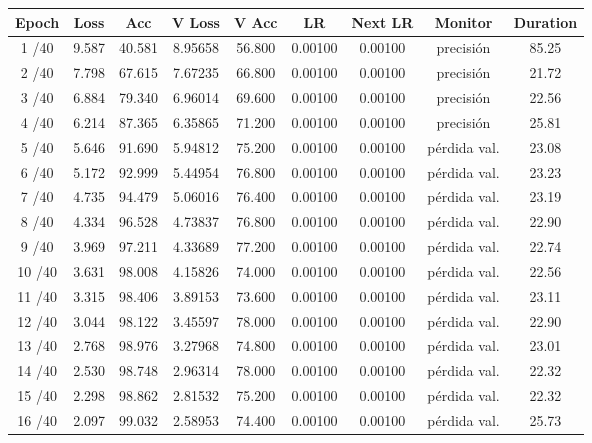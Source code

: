     \begin{table}[H]
        \small
        \centering
        \begin{tabular}{|c|c|c|c|c|c|c|c|c|}
        \hline
        \textbf{Epoch} & \textbf{Loss} & \textbf{Acc} & \textbf{V Loss} & \textbf{V Acc} & \textbf{LR} & \textbf{Next LR} & \textbf{Monitor} & \textbf{Duration} \\ \hline
        1 /40  & 9.587  & 40.581 & 8.95658 & 56.800 & 0.00100 & 0.00100 & precisión & 85.25  \\ \hline
        2 /40  & 7.798  & 67.615 & 7.67235 & 66.800 & 0.00100 & 0.00100 & precisión & 21.72  \\ \hline
        3 /40  & 6.884  & 79.340 & 6.96014 & 69.600 & 0.00100 & 0.00100 & precisión & 22.56  \\ \hline
        4 /40  & 6.214  & 87.365 & 6.35865 & 71.200 & 0.00100 & 0.00100 & precisión & 25.81  \\ \hline
        5 /40  & 5.646  & 91.690 & 5.94812 & 75.200 & 0.00100 & 0.00100 & pérdida val. & 23.08  \\ \hline
        6 /40  & 5.172  & 92.999 & 5.44954 & 76.800 & 0.00100 & 0.00100 & pérdida val. & 23.23  \\ \hline
        7 /40  & 4.735  & 94.479 & 5.06016 & 76.400 & 0.00100 & 0.00100 & pérdida val. & 23.19  \\ \hline
        8 /40  & 4.334  & 96.528 & 4.73837 & 76.800 & 0.00100 & 0.00100 & pérdida val. & 22.90  \\ \hline
        9 /40  & 3.969  & 97.211 & 4.33689 & 77.200 & 0.00100 & 0.00100 & pérdida val. & 22.74  \\ \hline
        10 /40 & 3.631  & 98.008 & 4.15826 & 74.000 & 0.00100 & 0.00100 & pérdida val. & 22.56  \\ \hline
        11 /40 & 3.315  & 98.406 & 3.89153 & 73.600 & 0.00100 & 0.00100 & pérdida val. & 23.11  \\ \hline
        12 /40 & 3.044  & 98.122 & 3.45597 & 78.000 & 0.00100 & 0.00100 & pérdida val. & 22.90  \\ \hline
        13 /40 & 2.768  & 98.976 & 3.27968 & 74.800 & 0.00100 & 0.00100 & pérdida val. & 23.01  \\ \hline
        14 /40 & 2.530  & 98.748 & 2.96314 & 78.000 & 0.00100 & 0.00100 & pérdida val. & 22.32  \\ \hline
        15 /40 & 2.298  & 98.862 & 2.81532 & 75.200 & 0.00100 & 0.00100 & pérdida val. & 22.32  \\ \hline
        16 /40 & 2.097  & 99.032 & 2.58953 & 74.400 & 0.00100 & 0.00100 & pérdida val. & 25.73  \\ \hline

\end{tabular}
\end{table}
